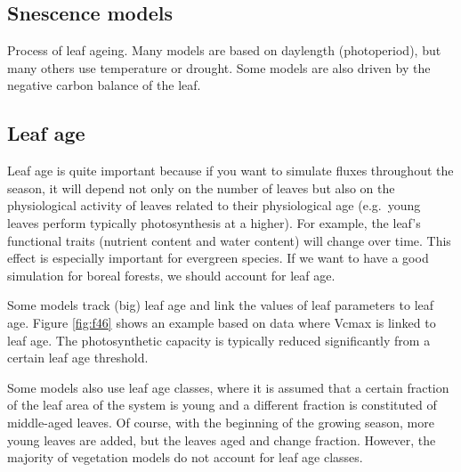 \documentclass[12pt,oneside]{book}
\begin{document}
\subsection{Snescence models}\label{snescence-models}

Process of leaf ageing. Many models are based on daylength
(photoperiod), but many others use temperature or drought. Some models
are also driven by the negative carbon balance of the leaf.

\subsection{Leaf age}\label{leaf-age}

Leaf age is quite important because if you want to simulate fluxes
throughout the season, it will depend not only on the number of leaves
but also on the physiological activity of leaves related to their
physiological age (e.g.~young leaves perform typically photosynthesis at
a higher). For example, the leaf's functional traits (nutrient content
and water content) will change over time. This effect is especially
important for evergreen species. If we want to have a good simulation
for boreal forests, we should account for leaf age.

Some models track (big) leaf age and link the values of leaf parameters
to leaf age. Figure \ref{fig:f46} shows an example based on data where
Vcmax is linked to leaf age. The photosynthetic capacity is typically
reduced significantly from a certain leaf age threshold.

Some models also use leaf age classes, where it is assumed that a
certain fraction of the leaf area of the system is young and a different
fraction is constituted of middle-aged leaves. Of course, with the
beginning of the growing season, more young leaves are added, but the
leaves aged and change fraction. However, the majority of vegetation
models do not account for leaf age classes.
\end{document}
